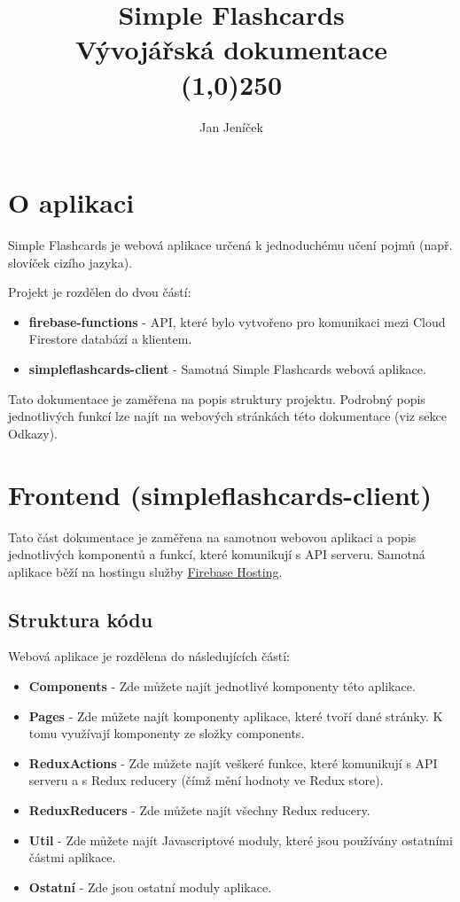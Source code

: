 \documentclass[a4paper,12pt]{article}
\begin{document}
\title{Simple Flashcards\\Vývojářská dokumentace \\\line(1,0){250}}
 \author{Jan Jeníček}
 \date{}
 \maketitle
 \clearpage
\tableofcontents
\clearpage

\section{O aplikaci}

Simple Flashcards je webová aplikace určená k jednoduchému učení pojmů (např. slovíček cizího jazyka).

Projekt je rozdělen do dvou částí:

\begin{itemize}
	\item \textbf{firebase-functions } - API, které bylo vytvořeno pro komunikaci mezi Cloud Firestore databází a klientem.
	\item \textbf{simpleflashcards-client} - Samotná Simple Flashcards webová aplikace.
\end{itemize}

Tato dokumentace je zaměřena na popis struktury projektu. Podrobný popis jednotlivých funkcí lze najít na webových stránkách této dokumentace (viz sekce Odkazy).

\section{Frontend (simpleflashcards-client)}
Tato část dokumentace je zaměřena na samotnou webovou aplikaci a popis jednotlivých komponentů a funkcí, které komunikují s API serveru. Samotná aplikace běží na hostingu služby \href{https://firebase.google.com/docs/hosting}{Firebase Hosting}.

\subsection{Struktura kódu}
Webová aplikace je rozdělena do následujících částí:
\begin{itemize}
	\item \textbf{Components} - Zde můžete najít jednotlivé komponenty této aplikace.
	\item \textbf{Pages} - Zde můžete najít komponenty aplikace, které tvoří dané stránky. K tomu využívají komponenty ze složky components.
	\item \textbf{ReduxActions } - Zde můžete najít veškeré funkce, které komunikují s API serveru a s Redux reducery (čímž mění hodnoty ve Redux store).
	\item \textbf{ReduxReducers } - Zde můžete najít všechny Redux reducery.
	\item \textbf{Util } - Zde můžete najít Javascriptové moduly, které jsou používány ostatními částmi aplikace.
	\item \textbf{Ostatní } - Zde jsou ostatní moduly aplikace.
\end{itemize}
\end{document}
